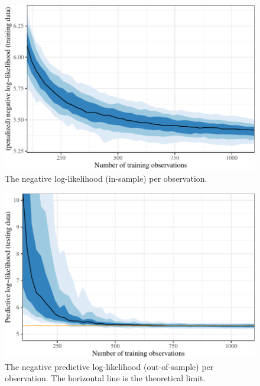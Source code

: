 \documentclass[11pt]{article}
\begin{document}
\begin{figure}[t]

{\centering \includegraphics{gfx/pen-negll-1} 

}

\caption{The negative log-likelihood (in-sample) per observation.}\label{fig:pen-negll}
\end{figure}

\begin{figure}[t]

{\centering \includegraphics{gfx/predict-negll-1} 

}

\caption{The negative predictive log-likelihood (out-of-sample) per observation. The horizontal line is the theoretical limit.}\label{fig:predict-negll}
\end{figure}
\end{document}
